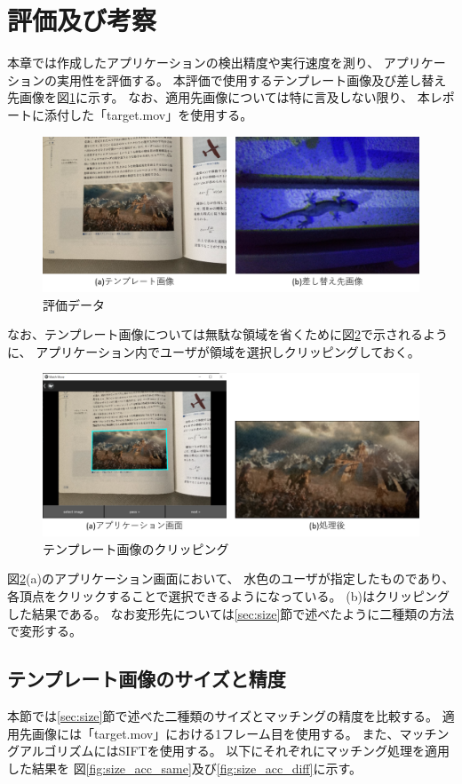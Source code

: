\section{評価及び考察}\label{sec:eval}
本章では作成したアプリケーションの検出精度や実行速度を測り、
アプリケーションの実用性を評価する。
本評価で使用するテンプレート画像及び差し替え先画像を図\ref{fig:data}に示す。
なお、適用先画像については特に言及しない限り、
本レポートに添付した「target.mov」を使用する。
\begin{figure}[h]
    \centering
    \includegraphics[width=1\linewidth]{fig/data.png}
    \caption{評価データ}
    \label{fig:data}
\end{figure}
なお、テンプレート画像については無駄な領域を省くために図\ref{fig:clip}で示されるように、
アプリケーション内でユーザが領域を選択しクリッピングしておく。
\begin{figure}[h]
    \centering
    \includegraphics[width=1\linewidth]{fig/clip.png}
    \caption{テンプレート画像のクリッピング}
    \label{fig:clip}
\end{figure}
図\ref{fig:clip}(a)のアプリケーション画面において、
水色のユーザが指定したものであり、
各頂点をクリックすることで選択できるようになっている。
(b)はクリッピングした結果である。
なお変形先については\ref{sec:size}節で述べたように二種類の方法で変形する。

\subsection{テンプレート画像のサイズと精度}\label{sec:size_acc}
本節では\ref{sec:size}節で述べた二種類のサイズとマッチングの精度を比較する。
適用先画像には「target.mov」における1フレーム目を使用する。
また、マッチングアルゴリズムにはSIFTを使用する。
以下にそれぞれにマッチング処理を適用した結果を
図\ref{fig:size_acc_same}及び\ref{fig:size_acc_diff}に示す。

